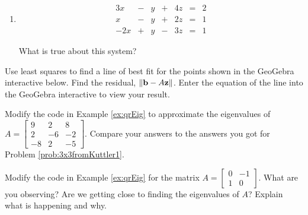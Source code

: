 \documentclass{ximera}
\begin{document}
\begin{problem}
\begin{enumerate}
    \item 
    \begin{equation}
\begin{array}{ccccccccc}
      3x &- &y&+&4z&= &2 \\
	 x&-&y&+&2z&=&1\\
     -2x&+&y&-&3z&=&1
    \end{array}
    \end{equation}

    What is true about this system?
    \begin{multipleChoice}
    \end{multipleChoice}

         \end{enumerate}
\end{problem}

\begin{problem}\label{prob_oct_lineFit}
  Use least squares to find a line of best fit for the points shown in the GeoGebra interactive below. Find the residual, $\left\lVert\mathbf{b}-A\mathbf{z}\right\rVert$.  
  Enter the equation of the line into the GeoGebra interactive to view your result.

  \begin{center}
  \end{center}

\end{problem}

\begin{problem}\label{prob_oct_qr1}
Modify the code in Example \ref{ex:qrEig} to approximate the eigenvalues of $A=\begin{bmatrix} 9 & 2 & 8\\ 2 & -6 & -2\\ -8 & 2 & -5\end{bmatrix}$.  Compare your answers to the answers you got for Problem \ref{prob:3x3fromKuttler1}. 
\end{problem}

\begin{problem}\label{prob_oct_qr2}
  Modify the code in Example \ref{ex:qrEig} for the matrix $A=\begin{bmatrix} 0 & -1\\ 1 & 0 \end{bmatrix}$.  What are you observing?  Are we getting close to finding the eigenvalues of $A$?  Explain what is happening and why.
  \end{problem}
\end{document}
